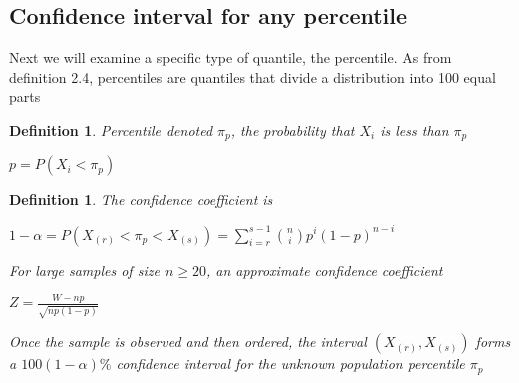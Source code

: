 \documentclass[11pt,a4paper]{article}
\theoremstyle{plain}
\newtheorem{de}[fact]{Definition}
\begin{document}
\subsection*{Confidence interval for any percentile}
Next we will examine a specific type of quantile, the percentile. As from definition 2.4, percentiles are quantiles that divide a distribution into 100 equal parts
\begin{de}
Percentile denoted $\pi_p$, the probability that $X_i$ is less than $\pi_p$
\begin{center}
$p=P(X_i<\pi_p)$
\end{center}
\end{de}

\begin{de}
The confidence coefficient is
\begin{center}
$1-\alpha=P(X_{(r)}<\pi_p<X_{(s)})=\sum_{i=r}^{s-1}\binom{n}{i}p^i(1-p)^{n-i}$
\end{center}
For large samples of size $n \geq 20$, an approximate confidence coefficient
\begin{center}
$Z=\frac{W-np}{\sqrt{np(1-p)}}$
\end{center}
Once the sample is observed and then ordered, the interval $(X_{(r)},X_{(s)})$ forms a  $100(1-\alpha)\%$ confidence interval for the unknown population percentile $\pi_p$
\end{de}
\end{document}
